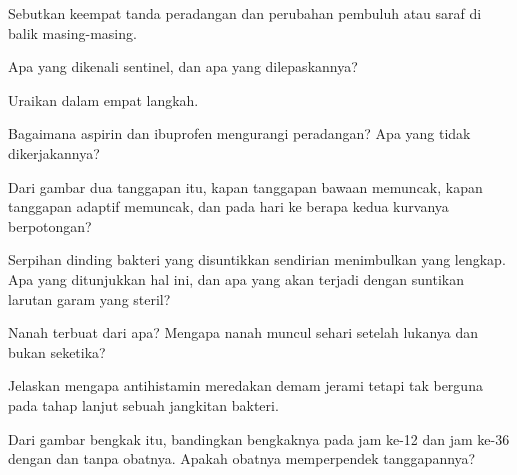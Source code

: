 \begin{exercise}[$\star$]\label{exo:g12:innate-immunity:2}
Sebutkan keempat tanda peradangan dan perubahan pembuluh atau saraf di
balik masing-masing.
\end{exercise}

\begin{exercise}[$\star$]\label{exo:g12:innate-immunity:3}
Apa yang dikenali  sentinel, dan apa yang dilepaskannya?
\end{exercise}

\begin{exercise}[$\star$]\label{exo:g12:innate-immunity:4}
Uraikan  dalam empat langkah.
\end{exercise}

\begin{exercise}[$\star$]\label{exo:g12:innate-immunity:5}
Bagaimana aspirin dan ibuprofen mengurangi peradangan? Apa yang tidak
dikerjakannya?
\end{exercise}

\begin{exercise}[$\star\star$]\label{exo:g12:innate-immunity:6}
Dari gambar dua tanggapan itu, kapan tanggapan bawaan memuncak, kapan
tanggapan adaptif memuncak, dan pada hari ke berapa kedua kurvanya
berpotongan?
\end{exercise}

\begin{exercise}[$\star\star$]\label{exo:g12:innate-immunity:7}
Serpihan dinding bakteri yang disuntikkan sendirian menimbulkan
 yang lengkap. Apa yang ditunjukkan hal ini, dan apa
yang akan terjadi dengan suntikan larutan garam yang steril?
\end{exercise}

\begin{exercise}[$\star\star$]\label{exo:g12:innate-immunity:8}
Nanah terbuat dari apa? Mengapa nanah muncul sehari setelah lukanya
dan bukan seketika?
\end{exercise}

\begin{exercise}[$\star\star$]\label{exo:g12:innate-immunity:9}
Jelaskan mengapa antihistamin meredakan demam jerami tetapi tak
berguna pada tahap lanjut sebuah jangkitan bakteri.
\end{exercise}

\begin{exercise}[$\star\star$]\label{exo:g12:innate-immunity:10}
Dari gambar bengkak itu, bandingkan bengkaknya pada jam ke-12 dan jam
ke-36 dengan dan tanpa obatnya. Apakah obatnya memperpendek
tanggapannya?
\end{exercise}

